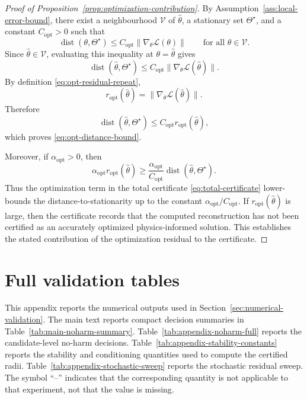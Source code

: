 \documentclass{article}
\numberwithin{equation}{section}
\DeclareMathOperator{\dist}{dist}
\theoremstyle{definition}
\begin{document}
\begin{proof}[Proof of Proposition~\ref{prop:optimization-contribution}]
By Assumption~\ref{ass:local-error-bound}, there exist a neighbourhood \(\mathcal V\) of \(\widehat\theta\), a stationary set \(\Theta^\star\), and a constant \(C_{\mathrm{opt}}>0\) such that
\[
\dist(\theta,\Theta^\star)
\le
C_{\mathrm{opt}}\|\nabla_\theta\mathcal L(\theta)\|
\qquad
\text{for all } \theta\in\mathcal V.
\]
Since \(\widehat\theta\in\mathcal V\), evaluating this inequality at \(\theta=\widehat\theta\) gives
\[
\dist(\widehat\theta,\Theta^\star)
\le
C_{\mathrm{opt}}\|\nabla_\theta\mathcal L(\widehat\theta)\|.
\]
By definition \eqref{eq:opt-residual-repeat},
\[
r_{\mathrm{opt}}(\widehat\theta)
=
\|\nabla_\theta\mathcal L(\widehat\theta)\|.
\]
Therefore
\[
\dist(\widehat\theta,\Theta^\star)
\le
C_{\mathrm{opt}}r_{\mathrm{opt}}(\widehat\theta),
\]
which proves \eqref{eq:opt-distance-bound}.

Moreover, if \(\alpha_{\mathrm{opt}}>0\), then
\[
\alpha_{\mathrm{opt}}r_{\mathrm{opt}}(\widehat\theta)
\ge
\frac{\alpha_{\mathrm{opt}}}{C_{\mathrm{opt}}}
\dist(\widehat\theta,\Theta^\star).
\]
Thus the optimization term in the total certificate \eqref{eq:total-certificate} lower-bounds the distance-to-stationarity up to the constant \(\alpha_{\mathrm{opt}}/C_{\mathrm{opt}}\). If \(r_{\mathrm{opt}}(\widehat\theta)\) is large, then the certificate records that the computed reconstruction has not been certified as an accurately optimized physics-informed solution. This establishes the stated contribution of the optimization residual to the certificate.
\end{proof}


\section{Full validation tables}
\label{app:full-validation-results}

This appendix reports the numerical outputs used in Section~\ref{sec:numerical-validation}. The main text reports compact decision summaries in Table~\ref{tab:main-noharm-summary}. Table~\ref{tab:appendix-noharm-full} reports the candidate-level no-harm decisions. Table~\ref{tab:appendix-stability-constants} reports the stability and conditioning quantities used to compute the certified radii. Table~\ref{tab:appendix-stochastic-sweep} reports the stochastic residual sweep. The symbol ``--'' indicates that the corresponding quantity is not applicable to that experiment, not that the value is missing.
\end{document}
